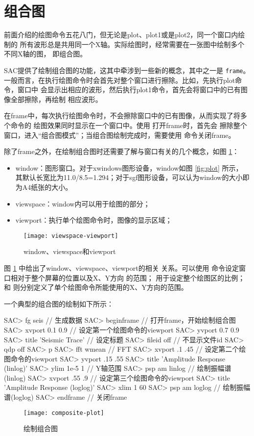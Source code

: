 \section{组合图}
\label{sec:composite-plots}

前面介绍的绘图命令五花八门，但无论是plot、plot1或是plot2，同一个窗口内绘制的
所有波形总是共用同一个X轴。实际绘图时，经常需要在一张图中绘制多个不同X轴的图，
即组合图。

SAC提供了绘制组合图的功能，这其中牵涉到一些新的概念，其中之一是 \texttt{frame}。
一般而言，在执行绘图命令时会首先对整个窗口进行擦除。比如，先执行plot命令，窗口中
会显示出相应的波形，然后执行plot1命令，首先会将窗口中的已有图像全部擦除，再绘制
相应波形。

在frame中，每次执行绘图命令时，不会擦除窗口中的已有图像，从而实现了将多个命令的
绘图效果同时显示在一个窗口中。使用  打开frame时，首先会
擦除整个窗口，进入``组合图模式''；当组合图绘制完成时，需要使用  命令关闭frame。

除了frame之外，在绘制组合图时还需要了解与窗口有关的几个概念，如图 \ref{fig:window-viewspace-viewport}：
\begin{itemize}
\item window：图形窗口。对于xwindows图形设备，window如图 \ref{fig:plot} 所示，
    其默认长宽比为11.0/8.5=1.294；对于sgf图形设备，可以认为window的大小即为A4纸张的大小。
\item viewspace：window内可以用于绘图的部分；
\item viewport：执行单个绘图命令时，图像的显示区域；
\end{itemize}

\begin{figure}[H]
\centering
\texttt{[image: viewspace-viewport]}
\caption{window、viewspace和viewport}
\label{fig:window-viewspace-viewport}
\end{figure}

图 \ref{fig:window-viewspace-viewport} 中给出了window、viewspace、viewport的相关
关系。可以使用  命令设定窗口相对于整个屏幕的位置以及X、Y方向
的范围； 用于设定整个绘图区的比例； 和
 则分别定义了单个绘图命令所能使用的X、Y方向的范围。

一个典型的组合图的绘制如下所示：
\begin{SACCode}
SAC> fg seis                        // 生成数据
SAC> beginframe                     // 打开frame，开始绘制组合图
SAC> xvport 0.1 0.9                 // 设定第一个绘图命令的viewport
SAC> yvport 0.7 0.9
SAC> title 'Seismic Trace'          // 设定标题
SAC> fileid off                     // 不显示文件id
SAC> qdp off
SAC> p
SAC> fft wmean                      // FFT
SAC> xvport .1 .45                  // 设定第二个绘图命令的viewport
SAC> yvport .15 .55
SAC> title 'Amplitude Response (linlog)'
SAC> ylim 1e-5 1                    // Y轴范围
SAC> psp am linlog                  // 绘制振幅谱(linlog)
SAC> xvport .55 .9                  // 设定第三个绘图命令的viewport
SAC> title 'Amplitude Response (loglog)'
SAC> xlim 1 60
SAC> psp am loglog                  // 绘制振幅谱(loglog)
SAC> endframe                       // 关闭frame
\end{SACCode}

\begin{figure}[H]
\centering
\texttt{[image: composite-plot]}
\caption{绘制组合图}
\label{fig:composite-plot}
\end{figure}
